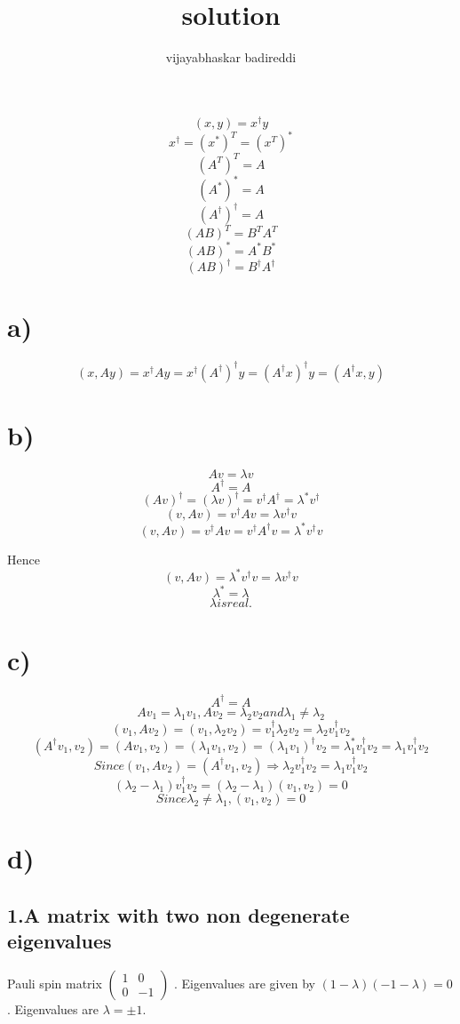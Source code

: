 \documentclass[12pt]{article}
\title{solution}
\author{vijayabhaskar badireddi}
\date{}
\begin{document}
\maketitle
\[ (x,y)=x^{\dag}y \]
\[ x^{\dag}=(x^*)^T=(x^T)^* \]
\[ \left(A^T\right)^T=A \]
\[ \left(A^*\right)^*=A \]
\[ \left(A^\dag\right)^\dag=A \]
\[ \left(AB\right)^T=B^TA^T \]
\[ \left(AB\right)^*=A^*B^* \]
\[ \left(AB\right)^\dag=B^\dag A^\dag
\]
\section*{a)}
\[
(x,Ay)=x^\dag Ay=x^\dag \left(A^\dag \right )^\dag y=\left(A^{\dag}x \right )^\dag y=(A^\dag x,y)
\]
\section*{b)}
\[
Av=\lambda v \]\[ A^\dag=A
\]
\[
\left(Av\right)^\dag=\left(\lambda v\right)^\dag=v^\dag A^\dag=\lambda^*v^\dag
\]
\[
\left(v,Av \right )=v^\dag Av=\lambda v^\dag v
\]
\[
\left(v,Av \right )=v^\dag Av=v^\dag A^\dag v=\lambda^* v^\dag v
\]

Hence \[ \left(v,Av \right )=\lambda^* v^\dag v=\lambda v^\dag v
\]
\[
\lambda^*=\lambda \]\[ \lambda is real.
\]
\section*{c)}
\[
A^\dag=A
\]
\[
Av_1=\lambda_1v_1, Av_2=\lambda_2v_2 and \lambda_1\ne\lambda_2
\]
\[
\left(v_1,Av_2 \right )=\left(v_1,\lambda_2v_2 \right )=v_1^\dag\lambda_2v_2=\lambda_2 v_1^\dag v_2
\]
\[
\left(A^\dag v_1,v_2 \right )=\left(A v_1,v_2 \right )=\left(\lambda_1v_1,v_2 \right )=(\lambda_1v_1)^\dag v_2=\lambda_1^*v_1^\dag v_2=\lambda_1v_1^\dag v_2
\]
\[
Since \left(v_1,Av_2 \right )=\left(A^\dag v_1,v_2 \right )\Rightarrow \lambda_2 v_1^\dag v_2=\lambda_1v_1^\dag v_2
\]
\[
(\lambda_2-\lambda_1) v_1^\dag v_2=(\lambda_2-\lambda_1) (v_1, v_2)=0
\]
\[
Since \lambda_2\ne\lambda_1 ,  (v_1, v_2)=0
\]
\section*{d)}
\subsection*{1.A matrix with two non degenerate eigenvalues}

Pauli spin matrix \( \begin{pmatrix} 1 & 0\\ 0& -1 \end{pmatrix}\) . Eigenvalues are given by \( (1-\lambda)(-1-\lambda)=0 \) . Eigenvalues are  \( \lambda=\pm1 \).
\end{document}
